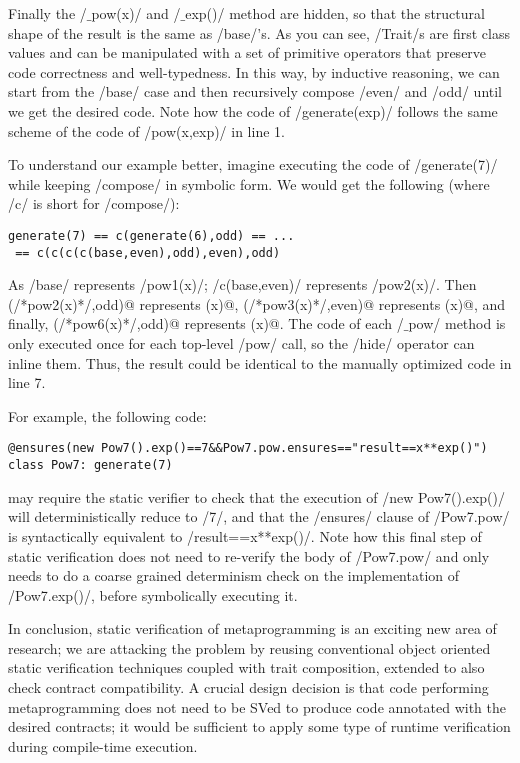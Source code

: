 Finally the /$\_$pow(x)/ and /$\_$exp()/ method are hidden, so that the structural shape of the result is
the same as /base/'s.
As you can see, /Trait/s are first class values and can be manipulated with a set of primitive operators that preserve code correctness and well-typedness.
In this way, by inductive reasoning, we can start from the /base/ case and then recursively compose /even/ and /odd/ until we get the desired code.
Note how the code of /generate(exp)/ follows the same scheme of the code of /pow(x,exp)/ in line 1.

To understand our example better, imagine executing the code of /generate(7)/ while keeping /compose/ in symbolic form. We would get the following (where /c/ is short for /compose/):
\vspace{-1ex}
\begin{lstlisting}[numbers=none]
generate(7) == c(generate(6),odd) == ...
 == c(c(c(c(base,even),odd),even),odd)
\end{lstlisting}
\vspace{-1ex}
As /base/ represents /pow1(x)/; /c(base,even)/ represents /pow2(x)/. Then \Q@c(/*pow2(x)*/,odd)@ represents (x)@, \Q@c(/*pow3(x)*/,even)@ represents (x)@, and finally,
\Q@c(/*pow6(x)*/,odd)@ represents (x)@.
The code of each /$\_$pow/ method is only executed once for each top-level /pow/ call, so the /hide/ operator can inline them.
Thus, the result could be identical to the manually optimized code in line 7.

 For example, the following code:
\vspace{-1ex}
\begin{lstlisting}[numbers=none]
@ensures(new Pow7().exp()==7&&Pow7.pow.ensures=="result==x**exp()")
class Pow7: generate(7)
\end{lstlisting}
\vspace{-1ex}
may require the static verifier to check that the execution of
/new Pow7().exp()/ will deterministically reduce to /7/, and that the /ensures/ clause of 
/Pow7.pow/ is syntactically equivalent to 
/result==x**exp()/. Note how this final step of static verification does not need to re-verify the body of
/Pow7.pow/ and only needs to do a coarse grained 
determinism check on the implementation of /Pow7.exp()/, before symbolically executing it.

In conclusion, static verification of metaprogramming is an exciting new area of research; we are attacking the problem by reusing conventional
object oriented static verification techniques coupled with trait composition, extended to also check contract compatibility. A crucial design decision is that code performing metaprogramming does not need to be SVed to produce code annotated with the desired contracts; it would be sufficient to apply some type of runtime verification during compile-time execution.